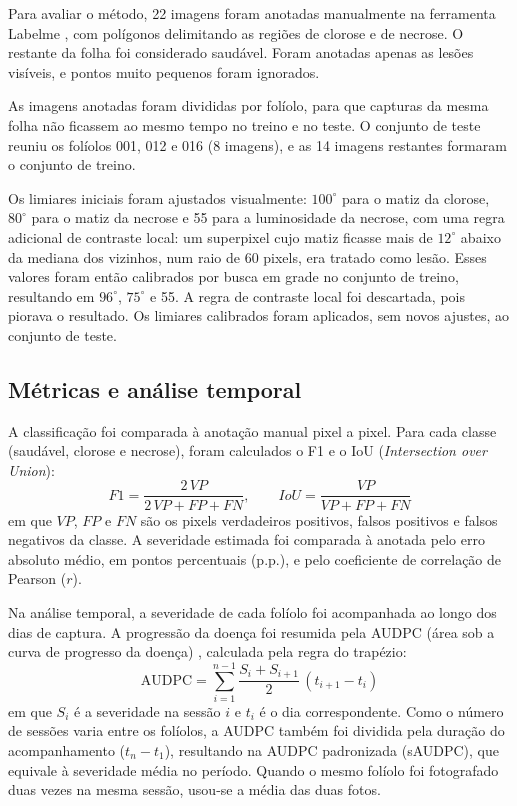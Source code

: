 \documentclass[10pt,a4paper,twocolumn]{article}
\begin{document}
Para avaliar o método, 22 imagens foram anotadas manualmente na
ferramenta Labelme \cite{labelme}, com polígonos delimitando as regiões
de clorose e de necrose. O restante da folha foi considerado saudável.
Foram anotadas apenas as lesões visíveis, e pontos muito pequenos foram
ignorados.

As imagens anotadas foram divididas por folíolo, para que capturas da
mesma folha não ficassem ao mesmo tempo no treino e no teste. O conjunto
de teste reuniu os folíolos 001, 012 e 016 (8 imagens), e as 14 imagens
restantes formaram o conjunto de treino.

Os limiares iniciais foram ajustados visualmente: $100^\circ$ para o
matiz da clorose, $80^\circ$ para o matiz da necrose e 55 para a
luminosidade da necrose, com uma regra adicional de contraste local:
um superpixel cujo matiz ficasse mais de $12^\circ$ abaixo da mediana dos
vizinhos, num raio de 60 pixels, era tratado como lesão. Esses valores
foram então calibrados por busca em grade no conjunto de treino,
resultando em $96^\circ$, $75^\circ$ e 55. A regra de contraste local
foi descartada, pois piorava o resultado. Os limiares
calibrados foram aplicados, sem novos ajustes, ao conjunto de teste.

\subsection{Métricas e análise temporal}

A classificação foi comparada à anotação manual pixel a pixel. Para cada
classe (saudável, clorose e necrose), foram calculados o F1 e o IoU
(\textit{Intersection over Union}):
\begin{equation}
F1 = \frac{2\,VP}{2\,VP + FP + FN}, \qquad
IoU = \frac{VP}{VP + FP + FN}
\end{equation}
em que $VP$, $FP$ e $FN$ são os pixels verdadeiros positivos, falsos
positivos e falsos negativos da classe. A severidade estimada foi
comparada à anotada pelo erro absoluto médio, em pontos percentuais
(p.p.), e pelo coeficiente de correlação de Pearson ($r$).

Na análise temporal, a severidade de cada folíolo foi acompanhada ao
longo dos dias de captura. A progressão da doença foi resumida pela
AUDPC (área sob a curva de progresso da doença) \cite{shaner1977},
calculada pela regra do trapézio:
\begin{equation}
\text{AUDPC} = \sum_{i=1}^{n-1} \frac{S_i + S_{i+1}}{2}\,(t_{i+1} - t_i)
\end{equation}
em que $S_i$ é a severidade na sessão $i$ e $t_i$ é o dia
correspondente. Como o número de sessões varia entre os folíolos, a
AUDPC também foi dividida pela duração do acompanhamento
($t_n - t_1$), resultando na AUDPC padronizada (sAUDPC), que equivale à
severidade média no período. Quando o mesmo folíolo foi fotografado
duas vezes na mesma sessão, usou-se a média das duas fotos.
\end{document}
